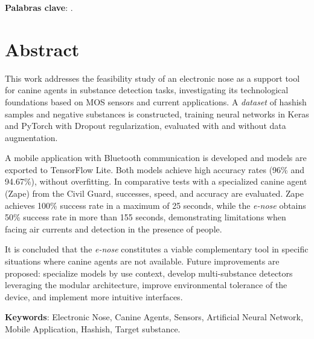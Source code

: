 \documentclass[hidelinks, headlogo, framedcover]{tfeEPCC}
\begin{document}
\noindent\textbf{Palabras clave}: \printkeywords.

\newpage
\null%
\thispagestyle{empty}
\newpage

\chapter*{Abstract}
This work addresses the feasibility study of an electronic nose as a support tool for canine agents in substance detection tasks, investigating its technological foundations based on MOS sensors and current applications. A \textit{dataset} of hashish samples and negative substances is constructed, training neural networks in Keras and PyTorch with Dropout regularization, evaluated with and without data augmentation.

A mobile application with Bluetooth communication is developed and models are exported to TensorFlow Lite. Both models achieve high accuracy rates (96\% and 94.67\%), without overfitting. In comparative tests with a specialized canine agent (Zape) from the Civil Guard, successes, speed, and accuracy are evaluated. Zape achieves 100\% success rate in a maximum of 25 seconds, while the \textit{e-nose} obtains 50\% success rate in more than 155 seconds, demonstrating limitations when facing air currents and detection in the presence of people.

It is concluded that the \textit{e-nose} constitutes a viable complementary tool in specific situations where canine agents are not available. Future improvements are proposed: specialize models by use context, develop multi-substance detectors leveraging the modular architecture, improve environmental tolerance of the device, and implement more intuitive interfaces.

\noindent\textbf{Keywords}: Electronic Nose, Canine Agents, Sensors, Artificial Neural Network, Mobile Application, Hashish, Target substance.

\newpage
\null%
\thispagestyle{empty}
\newpage

\newpage
\pagestyle{plain}
\tableofcontents
\newpage
\listoftables
\newpage
\newpage
\null%
\thispagestyle{empty}
\newpage
\listoffigures
\newpage
\newpage
\null%
\thispagestyle{empty}
\newpage
\end{document}
